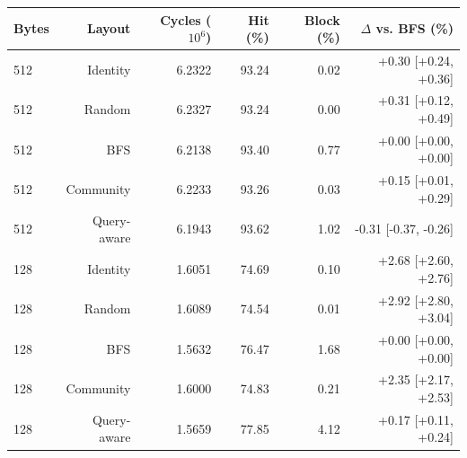 \begin{tabular}{lrrrrr}
\toprule
Bytes & Layout & Cycles ($10^6$) & Hit (\%) & Block (\%) & $\Delta$ vs. BFS (\%) \\
\midrule
512 & Identity & 6.2322 & 93.24 & 0.02 & +0.30 [+0.24, +0.36] \\
512 & Random & 6.2327 & 93.24 & 0.00 & +0.31 [+0.12, +0.49] \\
512 & BFS & 6.2138 & 93.40 & 0.77 & +0.00 [+0.00, +0.00] \\
512 & Community & 6.2233 & 93.26 & 0.03 & +0.15 [+0.01, +0.29] \\
512 & Query-aware & 6.1943 & 93.62 & 1.02 & -0.31 [-0.37, -0.26] \\
128 & Identity & 1.6051 & 74.69 & 0.10 & +2.68 [+2.60, +2.76] \\
128 & Random & 1.6089 & 74.54 & 0.01 & +2.92 [+2.80, +3.04] \\
128 & BFS & 1.5632 & 76.47 & 1.68 & +0.00 [+0.00, +0.00] \\
128 & Community & 1.6000 & 74.83 & 0.21 & +2.35 [+2.17, +2.53] \\
128 & Query-aware & 1.5659 & 77.85 & 4.12 & +0.17 [+0.11, +0.24] \\
\bottomrule
\end{tabular}
